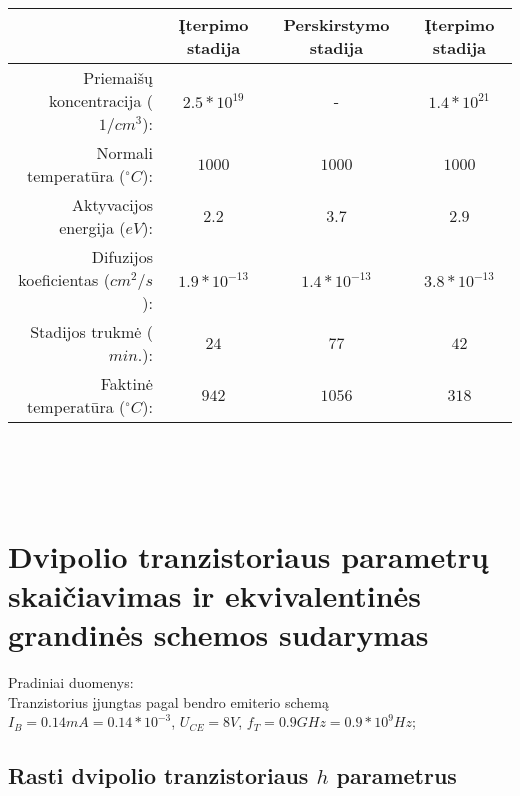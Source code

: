 \documentclass[11pt,a4paper]{article}
\begin{document}
\begin{tabular}{|r|c|c|c|}\hline
  & Įterpimo stadija & Perskirstymo stadija & Įterpimo stadija \\ \hline
  Priemaišų koncentracija ($1/cm^3$): & $2.5*10^{19}$   & -              & $1.4*10^{21}$ \\ \hline
  Normali temperatūra ($^{\circ}C$):   & $1000$         & $1000$         & $1000$ \\ \hline
  Aktyvacijos energija ($eV$):        & $2.2$          & $3.7$          & $2.9$ \\ \hline
  Difuzijos koeficientas ($cm^2/s$):  & $1.9*10^{-13}$  & $1.4*10^{-13}$  & $3.8*10^{-13}$ \\  \hline
  Stadijos trukmė ($min.$):           & $24$           & $77$           & $42$ \\ \hline
  Faktinė temperatūra ($^{\circ}C$):   & $942$          & $1056$         & $318$ \\ \hline
\end{tabular}\\\\\\


\section{Dvipolio tranzistoriaus parametrų skaičiavimas ir ekvivalentinės grandinės schemos sudarymas}
Pradiniai duomenys:\\
Tranzistorius įjungtas pagal bendro emiterio schemą\\
$I_B = 0.14 mA = 0.14 * 10^{-3}$, $U_{CE} = 8V$, $f_{T} = 0.9 GHz = 0.9*10^{9}Hz$;\\
\subsection{Rasti dvipolio tranzistoriaus $h$ parametrus}
\end{document}
